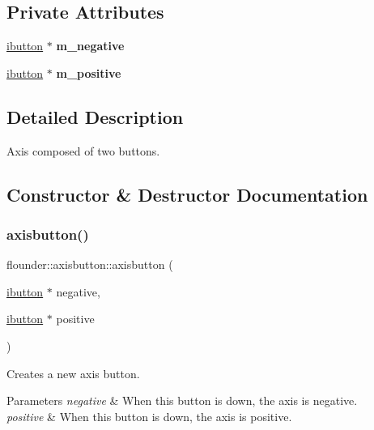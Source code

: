 \subsection*{Private Attributes}
\begin{DoxyCompactItemize}
\item 
\mbox{\label{classflounder_1_1axisbutton_aaee98b4b372e3df4968bf1cdb22a7e76}} 
\hyperlink{classflounder_1_1ibutton}{ibutton} $\ast$ {\bfseries m\+\_\+negative}
\item 
\mbox{\label{classflounder_1_1axisbutton_a4aa7adc6938d7ee7753d453a62f7f88e}} 
\hyperlink{classflounder_1_1ibutton}{ibutton} $\ast$ {\bfseries m\+\_\+positive}
\end{DoxyCompactItemize}


\subsection{Detailed Description}
Axis composed of two buttons. 



\subsection{Constructor \& Destructor Documentation}
\mbox{\label{classflounder_1_1axisbutton_a0f02ecccceb4155637ff3380335a0c62}} 
\subsubsection{\texorpdfstring{axisbutton()}{axisbutton()}}
{\footnotesize\ttfamily flounder\+::axisbutton\+::axisbutton (\begin{DoxyParamCaption}\item[{\hyperlink{classflounder_1_1ibutton}{ibutton} $\ast$}]{negative,  }\item[{\hyperlink{classflounder_1_1ibutton}{ibutton} $\ast$}]{positive }\end{DoxyParamCaption})}



Creates a new axis button. 


\begin{DoxyParams}{Parameters}
{\em negative} & When this button is down, the axis is negative. \\
\hline
{\em positive} & When this button is down, the axis is positive. \\
\hline
\end{DoxyParams}
\mbox{\label{classflounder_1_1axisbutton_a39d7d5faaf65ff5bef2cbded008762a9}} 
